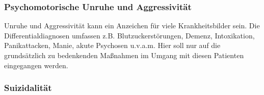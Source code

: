 % 
% 
% 
% 
% 
% 
% 
% 


\subsubsection{Psychomotorische Unruhe und Aggressivität}

Unruhe und Aggressivität kann ein Anzeichen für viele
Krankheitsbilder sein. Die Differentialdiagnosen umfassen
z.B. Blutzuckerstörungen, Demenz, Intoxikation,
Panikattacken, Manie, akute Psychosen u.v.a.m. Hier soll nur
auf die grundsätzlich zu bedenkenden Maßnahmen im Umgang mit diesen Patienten
eingegangen werden. 


\subsubsection{Suizidalität}



